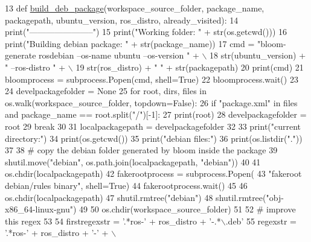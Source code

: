 \begin{DoxyCode}
13 \textcolor{keyword}{def }\hyperlink{namespacegenerate__debs_aa70c3f4917ddc57b13eaed8501f571a8}{build\_deb\_package}(workspace\_source\_folder, package\_name, packagepath, ubuntu\_version, 
      ros\_distro, already\_visited):
14     print(\textcolor{stringliteral}{"-----------------------"})
15     print(\textcolor{stringliteral}{"Working folder: "} + str(os.getcwd()))
16     print(\textcolor{stringliteral}{"Building debian package: "} + str(package\_name))
17     cmd = \textcolor{stringliteral}{"bloom-generate rosdebian --os-name ubuntu --os-version "} + \(\backslash\)
18         str(ubuntu\_version) + \textcolor{stringliteral}{" --ros-distro "} + \(\backslash\)
19         str(ros\_distro) + \textcolor{stringliteral}{" "} + str(packagepath)
20     print(cmd)
21     bloomprocess = subprocess.Popen(cmd, shell=\textcolor{keyword}{True})
22     bloomprocess.wait()
23 
24     develpackagefolder = \textcolor{keywordtype}{None}
25     \textcolor{keywordflow}{for} root, dirs, files \textcolor{keywordflow}{in} os.walk(workspace\_source\_folder, topdown=\textcolor{keyword}{False}):
26         \textcolor{keywordflow}{if} \textcolor{stringliteral}{"package.xml"} \textcolor{keywordflow}{in} files \textcolor{keywordflow}{and} package\_name == root.split(\textcolor{stringliteral}{"/"})[-1]:
27             print(root)
28             develpackagefolder = root
29             \textcolor{keywordflow}{break}
30 
31     localpackagepath = develpackagefolder
32 
33     print(\textcolor{stringliteral}{"current directory:"})
34     print(os.getcwd())
35     print(\textcolor{stringliteral}{"debian files:"})
36     print(os.listdir(\textcolor{stringliteral}{"."}))
37 
38     \textcolor{comment}{# copy the debian folder generated by bloom inside the package}
39     shutil.move(\textcolor{stringliteral}{"debian"}, os.path.join(localpackagepath, \textcolor{stringliteral}{"debian"}))
40 
41     os.chdir(localpackagepath)
42     fakerootprocess = subprocess.Popen(
43         \textcolor{stringliteral}{"fakeroot debian/rules binary"}, shell=\textcolor{keyword}{True})
44     fakerootprocess.wait()
45 
46     os.chdir(localpackagepath)
47     shutil.rmtree(\textcolor{stringliteral}{"debian"})
48     shutil.rmtree(\textcolor{stringliteral}{"obj-x86\_64-linux-gnu"})
49 
50     os.chdir(workspace\_source\_folder)
51 
52     \textcolor{comment}{# improve this regex}
53 
54     firstregexstr = \textcolor{stringliteral}{'.*ros-'} + ros\_distro + \textcolor{stringliteral}{'-.*\(\backslash\).deb'}
55     regexstr = \textcolor{stringliteral}{'.*ros-'} + ros\_distro + \textcolor{stringliteral}{'-'} + \(\backslash\)

\end{DoxyCode}
